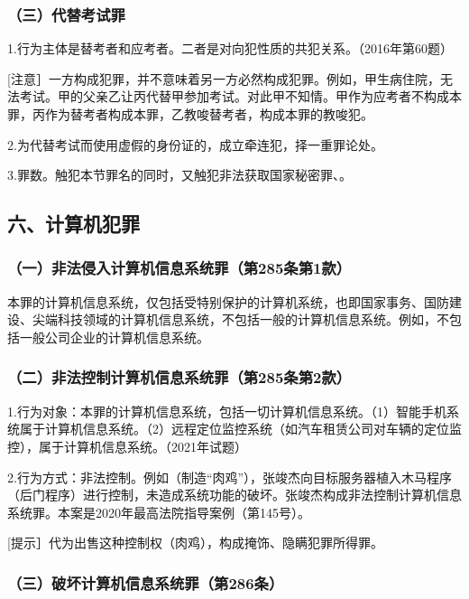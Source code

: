 \subsubsection*{（三）代替考试罪}

1.行为主体是替考者和应考者。二者是对向犯性质的共犯关系。（2016年第60题）

[注意］一方构成犯罪，并不意味着另一方必然构成犯罪。例如，甲生病住院，无法考试。甲的父亲乙让丙代替甲参加考试。对此甲不知情。甲作为应考者不构成本罪，丙作为替考者构成本罪，乙教唆替考者，构成本罪的教唆犯。

2.为代替考试而使用虚假的身份证的，成立牵连犯，择一重罪论处。

3.罪数。触犯本节罪名的同时，又触犯非法获取国家秘密罪、。

\subsection*{六、计算机犯罪}

\subsubsection*{（一）非法侵入计算机信息系统罪（第285条第1款）}

本罪的计算机信息系统，仅包括受特别保护的计算机系统，也即国家事务、国防建设、尖端科技领域的计算机信息系统，不包括一般的计算机信息系统。例如，不包括一般公司企业的计算机信息系统。

\subsubsection*{（二）非法控制计算机信息系统罪（第285条第2款）}

1.行为对象：本罪的计算机信息系统，包括一切计算机信息系统。（1）智能手机系统属于计算机信息系统。（2）远程定位监控系统（如汽车租赁公司对车辆的定位监控），属于计算机信息系统。（2021年试题）

2.行为方式：非法控制。例如（制造“肉鸡”），张竣杰向目标服务器植入木马程序（后门程序）进行控制，未造成系统功能的破坏。张竣杰构成非法控制计算机信息系统罪。本案是2020年最高法院指导案例（第145号）。

[提示］代为出售这种控制权（肉鸡），构成掩饰、隐瞒犯罪所得罪。

\subsubsection*{（三）破坏计算机信息系统罪（第286条）}

